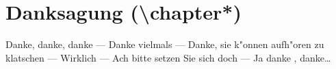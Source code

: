 \documentclass[nochapterpage,bigchapter,linedtoc,longdoc,colorback,accentcolor=tud3a]{tudreport}
\begin{document}
  \chapter*{Danksagung (\textbackslash chapter*)}    \noindent
      Danke, danke, danke --- Danke vielmals --- Danke, sie k"onnen aufh"oren zu klatschen ---
      Wirklich --- Ach bitte setzen Sie sich doch --- Ja danke , danke\dots

  \listoffigures{}
\end{document}

